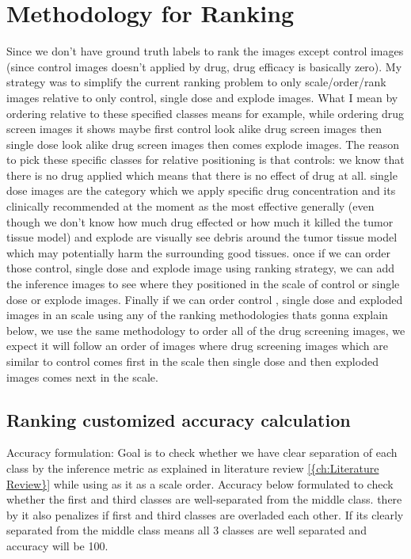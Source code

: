 \chapter{Methodology for Ranking}\label{ch:Methodology for Ranking}
 
Since we don't have ground truth labels to rank the images except control images (since control images doesn't applied by drug, drug efficacy is basically zero).
My strategy was to simplify the current ranking problem to only scale/order/rank images relative to only control, single dose and explode images. What I mean by ordering relative to these specified classes means for example, while ordering drug screen images it shows maybe first control look alike drug screen images then single dose look alike drug screen images then comes explode images. 
The reason to pick these specific classes for relative positioning is that controls: we know that there is no drug applied which means that there is no effect of drug at all. 
single dose images are the category which we apply specific drug concentration and its clinically recommended at the moment as the most effective generally (even though we don't know how much drug effected or how much it killed the tumor tissue model) 
and explode are visually see debris around the tumor tissue model which may potentially harm the surrounding good tissues.
once if we can order those control, single dose and explode image using ranking strategy, we can add the  inference images to see where they positioned in the scale of control or single dose or explode images. Finally if we can order control , single dose and exploded images in an scale using any of the ranking methodologies thats gonna explain below, we use the same methodology to order all of the drug screening images, we expect it will follow an order of images  where drug screening images which are similar to control comes first in the scale then single dose and then exploded images comes next in the scale.

\section*{Ranking customized accuracy calculation}
Accuracy formulation: Goal is to check whether we have clear separation of each class by the inference metric as explained in literature review \ref{{ch:Literature Review}} while using as it as a scale order. Accuracy below formulated to check whether the first and third classes are well-separated from the middle class. there by it also penalizes if first and third classes are overladed each other. If its clearly separated from the middle class means all 3 classes  are well separated and accuracy will be 100.

